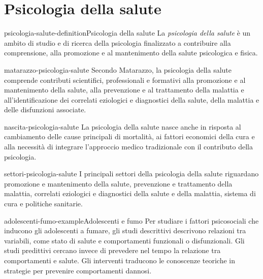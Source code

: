 \documentclass[preview]{standalone}
\begin{document}
\genpage

\section{Psicologia della salute}

\begin{snippetdefinition}{psicologia-salute-definition}{Psicologia della salute}
    La \emph{psicologia della salute} è un ambito di studio e di ricerca della
    psicologia finalizzato a contribuire alla comprensione, alla promozione e al
    mantenimento della salute psicologica e fisica.
\end{snippetdefinition}

\begin{snippet}{matarazzo-psicologia-salute}
    Secondo Matarazzo, la psicologia della salute comprende contributi
    scientifici, professionali e formativi alla promozione e al mantenimento
    della salute, alla prevenzione e al trattamento della malattia e
    all'identificazione dei correlati eziologici e diagnostici della salute,
    della malattia e delle disfunzioni associate.
\end{snippet}

\begin{snippet}{nascita-psicologia-salute}
    La psicologia della salute nasce anche in risposta al cambiamento delle cause
    principali di mortalità, ai fattori economici della cura e alla necessità di
    integrare l'approccio medico tradizionale con il contributo della psicologia.
\end{snippet}

\begin{snippet}{settori-psicologia-salute}
    I principali settori della psicologia della salute riguardano promozione e
    mantenimento della salute, prevenzione e trattamento della malattia,
    correlati eziologici e diagnostici della salute e della malattia, sistema di
    cura e politiche sanitarie.
\end{snippet}

\begin{snippetexample}{adolescenti-fumo-example}{Adolescenti e fumo}
    Per studiare i fattori psicosociali che inducono gli adolescenti a fumare,
    gli studi descrittivi descrivono relazioni tra variabili, come stato di
    salute e comportamenti funzionali o disfunzionali. Gli studi predittivi
    cercano invece di prevedere nel tempo la relazione tra comportamenti e salute.
    Gli interventi traducono le conoscenze teoriche in strategie per prevenire
    comportamenti dannosi.
\end{snippetexample}
\end{document}
